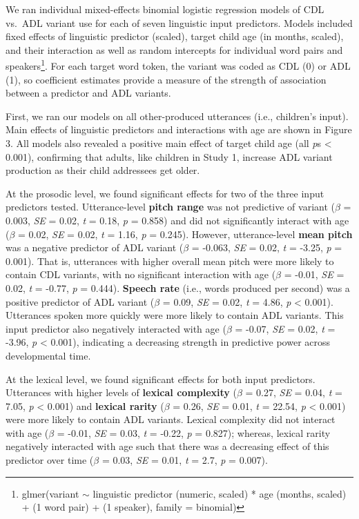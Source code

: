 \documentclass[10pt, letterpaper]{article}
\begin{document}
We ran individual mixed-effects binomial logistic regression models of
CDL vs.~ADL variant use for each of seven linguistic input predictors.
Models included fixed effects of linguistic predictor (scaled), target
child age (in months, scaled), and their interaction as well as random
intercepts for individual word pairs and speakers\footnote{glmer(variant
  \(\sim\) linguistic predictor (numeric, scaled) * age (months, scaled)
  + (1 \textbar{} word pair) + (1 \textbar{} speaker), family =
  binomial)}. For each target word token, the variant was coded as CDL
(0) or ADL (1), so coefficient estimates provide a measure of the
strength of association between a predictor and ADL variants.

First, we ran our models on all other-produced utterances (i.e.,
children's input). Main effects of linguistic predictors and
interactions with age are shown in Figure 3. All models also revealed a
positive main effect of target child age (all \emph{p}s \textless{}
0.001), confirming that adults, like children in Study 1, increase ADL
variant production as their child addressees get older.

At the prosodic level, we found significant effects for two of the three
input predictors tested. Utterance-level \textbf{pitch range} was not
predictive of variant (\(\beta\) = 0.003, \emph{SE} = 0.02, \emph{t} =
0.18, \emph{p} = 0.858) and did not significantly interact with age
(\(\beta\) = 0.02, \emph{SE} = 0.02, \emph{t} = 1.16, \emph{p} = 0.245).
However, utterance-level \textbf{mean pitch} was a negative predictor of
ADL variant (\(\beta\) = -0.063, \emph{SE} = 0.02, \emph{t} = -3.25,
\emph{p} = 0.001). That is, utterances with higher overall mean pitch
were more likely to contain CDL variants, with no significant
interaction with age (\(\beta\) = -0.01, \emph{SE} = 0.02, \emph{t} =
-0.77, \emph{p} = 0.444). \textbf{Speech rate} (i.e., words produced per
second) was a positive predictor of ADL variant (\(\beta\) = 0.09,
\emph{SE} = 0.02, \emph{t} = 4.86, \emph{p} \textless{} 0.001).
Utterances spoken more quickly were more likely to contain ADL variants.
This input predictor also negatively interacted with age (\(\beta\) =
-0.07, \emph{SE} = 0.02, \emph{t} = -3.96, \emph{p} \textless{} 0.001),
indicating a decreasing strength in predictive power across
developmental time.

At the lexical level, we found significant effects for both input
predictors. Utterances with higher levels of \textbf{lexical complexity}
(\(\beta\) = 0.27, \emph{SE} = 0.04, \emph{t} = 7.05, \emph{p}
\textless{} 0.001) and \textbf{lexical rarity} (\(\beta\) = 0.26,
\emph{SE} = 0.01, \emph{t} = 22.54, \emph{p} \textless{} 0.001) were
more likely to contain ADL variants. Lexical complexity did not interact
with age (\(\beta\) = -0.01, \emph{SE} = 0.03, \emph{t} = -0.22,
\emph{p} = 0.827); whereas, lexical rarity negatively interacted with
age such that there was a decreasing effect of this predictor over time
(\(\beta\) = 0.03, \emph{SE} = 0.01, \emph{t} = 2.7, \emph{p} = 0.007).
\end{document}
